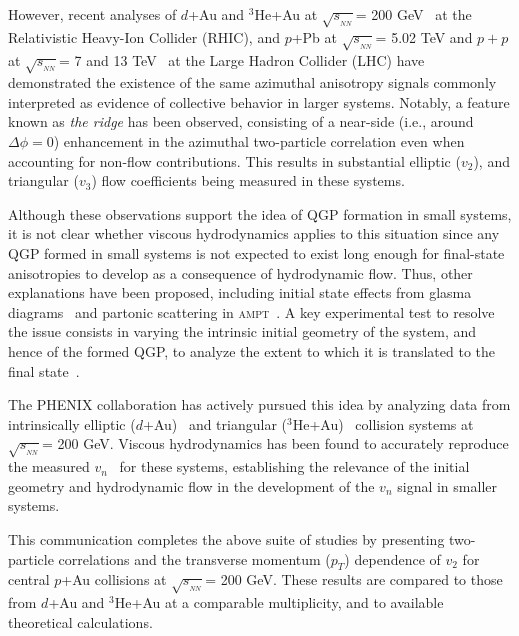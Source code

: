 \documentclass[%
reprint,
showpacs,preprintnumbers,
 amsmath,amssymb,
 aps,
]{revtex4-1}
\newcommand{\pt}{\mbox{$p_T$}\xspace}
\newcommand{\sqsn}{\mbox{$\sqrt{s_{_{NN}}}$}\xspace}
\newcommand{\dau}{\mbox{$d$+Au}\xspace}
\newcommand{\pau}{\mbox{$p$+Au}\xspace}
\newcommand{\hau}{\mbox{$^3\text{He}$+Au}\xspace}
\newcommand{\ppb}{\mbox{$p$+Pb}\xspace}
\begin{document}
However, recent analyses of \dau and \hau at \sqsn = 200 GeV~\cite{adare_measurement_2014,Adamczyk:2014fcx,PhysRevLett.115.142301} at the Relativistic Heavy-Ion Collider (RHIC), and \ppb at \sqsn = 5.02 TeV and $p+p$ at \sqsn = 7 and 13 TeV~\cite{alice_long_2013,atlas_observation_2012,cms_observation_2012,Khachatryan:2015lva,Aad:2015gqa} at the Large Hadron Collider (LHC) have demonstrated the existence of the same azimuthal anisotropy signals commonly interpreted as evidence of collective behavior in larger systems. Notably, a feature known as \textit{the ridge} has been observed, consisting of a near-side (i.e., around $\Delta \phi = 0$) enhancement in the azimuthal two-particle correlation even when accounting for non-flow contributions. This results in substantial elliptic ($v_2$), and triangular ($v_3$) flow coefficients being measured in these systems.

Although these observations support the idea of QGP formation in small systems, it is not clear whether viscous hydrodynamics applies to this situation since any QGP formed in small systems is not expected to exist long enough for final-state anisotropies to develop as a consequence of hydrodynamic flow. Thus, other explanations have been proposed, including initial state effects from glasma diagrams~\cite{dusling_azimuthal_2012} and partonic scattering in \textsc{ampt}~\cite{bzdak_elliptic_2014,ma_long-range_2014,Koop:2015wea}. A key experimental test to resolve the issue consists in varying the intrinsic initial geometry of the system, and hence of the formed QGP, to analyze the extent to which it is translated to the final state~\cite{nagle_exploiting_2013}. 

The PHENIX collaboration has actively pursued this idea by analyzing data from intrinsically elliptic (\dau)~\cite{adare_measurement_2014,PhysRevLett.111.212301} and triangular (\hau)~\cite{Adare:2015ctn} collision systems at \sqsn = 200 GeV. Viscous hydrodynamics has been found to accurately reproduce the measured $v_n$~\cite{Romatschke:2015gxa} for these systems, establishing the relevance of the initial geometry and hydrodynamic flow in the development of the $v_n$ signal in smaller systems.

This communication completes the above suite of studies by presenting two-particle correlations and the transverse momentum (\pt) dependence of $v_2$ for central \pau collisions at \sqsn = 200 GeV. These results are compared to those from \dau and \hau at a comparable multiplicity, and to available theoretical calculations.
\end{document}
